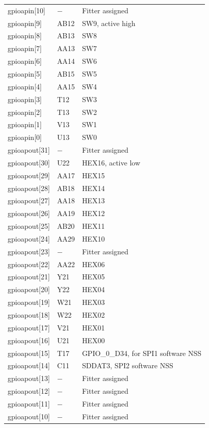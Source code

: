 \documentclass[12pt]{article}
\begin{document}
\begin{longtable}{lll}
gpioapin[10]  & $-$      & Fitter assigned \\
gpioapin[9]   & AB12     & SW9, active high \\
gpioapin[8]   & AB13     & SW8 \\
gpioapin[7]   & AA13     & SW7 \\
gpioapin[6]   & AA14     & SW6 \\
gpioapin[5]   & AB15     & SW5 \\
gpioapin[4]   & AA15     & SW4 \\
gpioapin[3]   & T12      & SW3 \\
gpioapin[2]   & T13      & SW2 \\
gpioapin[1]   & V13      & SW1 \\
gpioapin[0]   & U13      & SW0 \\
gpioapout[31] & $-$      & Fitter assigned \\
gpioapout[30] & U22      & HEX16, active low \\
gpioapout[29] & AA17     & HEX15 \\
gpioapout[28] & AB18     & HEX14 \\
gpioapout[27] & AA18     & HEX13 \\
gpioapout[26] & AA19     & HEX12 \\
gpioapout[25] & AB20     & HEX11 \\
gpioapout[24] & AA29     & HEX10 \\
gpioapout[23] & $-$      & Fitter assigned \\
gpioapout[22] & AA22     & HEX06 \\
gpioapout[21] & Y21      & HEX05 \\
gpioapout[20] & Y22      & HEX04 \\
gpioapout[19] & W21      & HEX03 \\
gpioapout[18] & W22      & HEX02 \\
gpioapout[17] & V21      & HEX01 \\
gpioapout[16] & U21      & HEX00 \\
gpioapout[15] & T17      & GPIO\_0\_D34, for SPI1 software NSS \\
gpioapout[14] & C11      & SDDAT3, SPI2 software NSS \\
gpioapout[13] & $-$      & Fitter assigned \\
gpioapout[12] & $-$      & Fitter assigned \\
gpioapout[11] & $-$      & Fitter assigned \\
gpioapout[10] & $-$      & Fitter assigned \\

\end{longtable}
\end{document}

